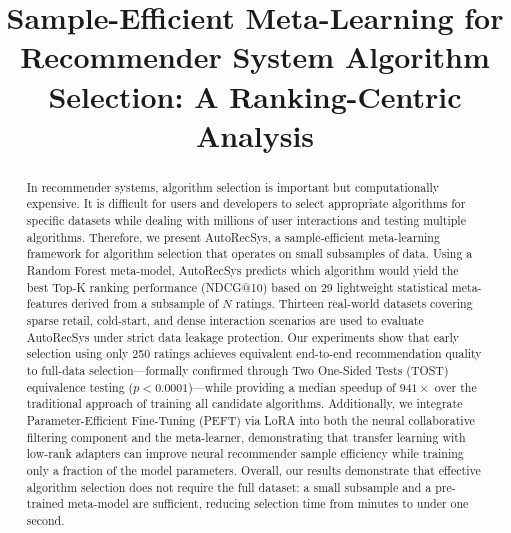 \documentclass[conference]{IEEEtran}
\begin{document}
\title{Sample-Efficient Meta-Learning for Recommender System Algorithm Selection: A Ranking-Centric Analysis}

\author{
    \and
}

\maketitle

\begin{abstract}
In recommender systems, algorithm selection is important but computationally expensive. It is difficult for users and developers to select appropriate algorithms for specific datasets while dealing with millions of user interactions and testing multiple algorithms. Therefore, we present AutoRecSys, a sample-efficient meta-learning framework for algorithm selection that operates on small subsamples of data. Using a Random Forest meta-model, AutoRecSys predicts which algorithm would yield the best Top-K ranking performance (NDCG@10) based on 29 lightweight statistical meta-features derived from a subsample of $N$ ratings. Thirteen real-world datasets covering sparse retail, cold-start, and dense interaction scenarios are used to evaluate AutoRecSys under strict data leakage protection. Our experiments show that early selection using only 250 ratings achieves equivalent end-to-end recommendation quality to full-data selection---formally confirmed through Two One-Sided Tests (TOST) equivalence testing ($p < 0.0001$)---while providing a median speedup of $941\times$ over the traditional approach of training all candidate algorithms. Additionally, we integrate Parameter-Efficient Fine-Tuning (PEFT) via LoRA \cite{hu2022lora} into both the neural collaborative filtering component and the meta-learner, demonstrating that transfer learning with low-rank adapters can improve neural recommender sample efficiency while training only a fraction of the model parameters. Overall, our results demonstrate that effective algorithm selection does not require the full dataset: a small subsample and a pre-trained meta-model are sufficient, reducing selection time from minutes to under one second.
\end{abstract}
\end{document}
